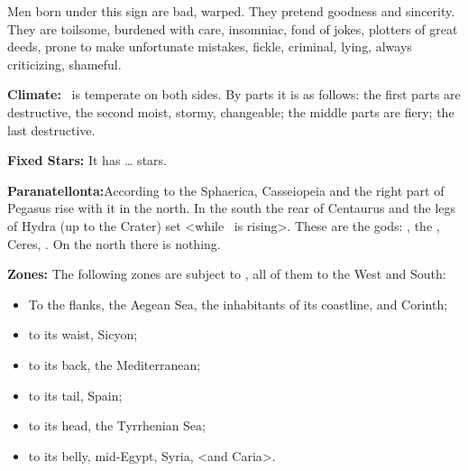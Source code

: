 Men born under this sign are bad, warped. They pretend goodness and sincerity. They are toilsome, burdened with care, insomniac, fond of jokes, plotters of great deeds, prone to make unfortunate mistakes, fickle, criminal, lying, always criticizing, shameful.

\textbf{Climate:} \Capricorn\, is temperate on both sides. By parts it is as follows: the first parts are destructive, the second moist, stormy, changeable; the middle parts are fiery; the last destructive. 

\textbf{Fixed Stars:} It has … stars.

\textbf{Paranatellonta:}According to the Sphaerica, Casseiopeia and the right part of Pegasus rise with it in the north. In the south the rear of Centaurus and the legs of Hydra (up to the Crater) set <while \Capricorn\, is rising>. These are the gods: \Venus, the \Moon, Ceres, \Mercury. On the north there is nothing.

\textbf{Zones:} The following zones are subject to \Capricorn, all of them to the West and South: 
\begin{itemize}
\item To the flanks, the Aegean Sea, the inhabitants of its coastline, and Corinth; 
\item to its waist, Sicyon; 
\item to its back, the Mediterranean; 
\item to its tail, Spain; 
\item to its head, the Tyrrhenian Sea; 
\item to its belly, mid-Egypt, Syria, <and Caria>.
\end{itemize}

\secbr

